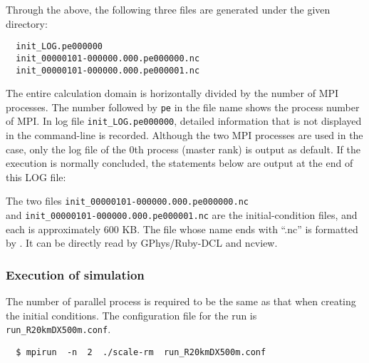 
Through the above, the following three files are generated under the given directory:
\begin{verbatim}
  init_LOG.pe000000
  init_00000101-000000.000.pe000000.nc
  init_00000101-000000.000.pe000001.nc
\end{verbatim}
The entire calculation domain is horizontally divided by the number of MPI processes.
The number followed by \verb|pe| in the file name shows the process number of MPI.
In log file \verb|init_LOG.pe000000|,
detailed information that is not displayed in the command-line is recorded.
Although the two MPI processes are used in the case,
only the log file of the 0th process (master rank) is output as default.
If the execution is normally concluded, the statements below are output at the end of this LOG file:


The two files
\verb|init_00000101-000000.000.pe000000.nc|\\ and \verb|init_00000101-000000.000.pe000001.nc| are the initial-condition files, and each is approximately 600 KB.
The file whose name ends with ``.nc''  is formatted by \netcdf.
It can be directly read by GPhys/Ruby-DCL and ncview.


\subsubsection{Execution of simulation} %

The number of parallel process is required to be the same as that when creating the initial conditions.
The configuration file for the run is \verb|run_R20kmDX500m.conf|.
\begin{verbatim}
  $ mpirun  -n  2  ./scale-rm  run_R20kmDX500m.conf
\end{verbatim}

